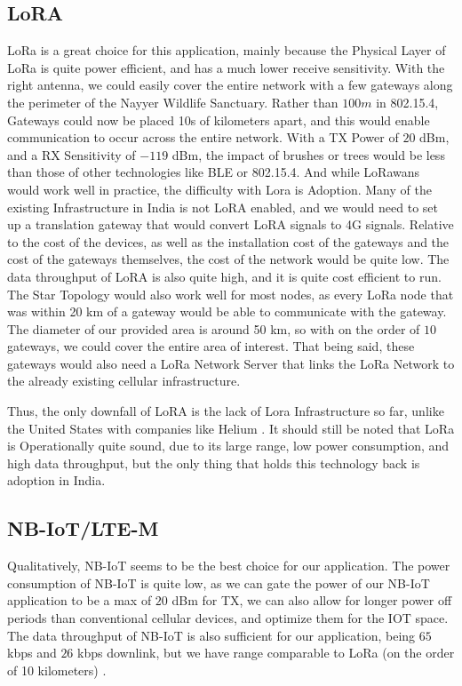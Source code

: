 \subsection{LoRA}
LoRa is a great choice for this application, mainly because the Physical Layer of LoRa is quite power efficient, and has a much lower receive sensitivity. With the right antenna, we could easily cover the entire network with a few gateways along the perimeter of the Nayyer Wildlife Sanctuary. Rather than $100m$ in 802.15.4, Gateways could now be placed 10s of kilometers apart, and this would enable communication to occur across the entire network. With a TX Power of $20$ dBm, and a RX Sensitivity of $-119$ dBm, the impact of brushes or trees would be less than those of other technologies like BLE or 802.15.4. And while LoRawans would work well in practice, the difficulty with Lora is Adoption. Many of the existing Infrastructure in India is not LoRA enabled, and we would need to set up a translation gateway that would convert LoRA signals to 4G signals. Relative to the cost of the devices, as well as the installation cost of the gateways and the cost of the gateways themselves, the cost of the network would be quite low. The data throughput of LoRA is also quite high, and it is quite cost efficient to run. The Star Topology would also work well for most nodes, as every LoRa node that was within 20 km of a gateway would be able to communicate with the gateway\cite{lorapat}. The diameter of our provided area is around 50 km, so with on the order of $10$ gateways, we could cover the entire area of interest. That being said, these gateways would also need a LoRa Network Server that links the LoRa Network to the already existing cellular infrastructure. 

Thus, the only downfall of LoRA is the lack of Lora Infrastructure so far, unlike the United States with companies like Helium \cite{loraIndia}. It should still be noted that LoRa is Operationally quite sound, due to its large range, low power consumption, and high data throughput, but the only thing that holds this technology back is adoption in India. 

\subsection{NB-IoT/LTE-M}

Qualitatively, NB-IoT seems to be the best choice for our application. The power consumption of NB-IoT is quite low, as we can gate the power of our NB-IoT application to be a max of $20$ dBm for TX, we can also allow for longer power off periods than conventional cellular devices, and optimize them for the IOT space. The data throughput of NB-IoT is also sufficient for our application, being $65$ kbps  and $26$ kbps downlink,\cite{cellpat} but we have range comparable to LoRa (on the order of 10 kilometers) \cite{amazonnb}.


